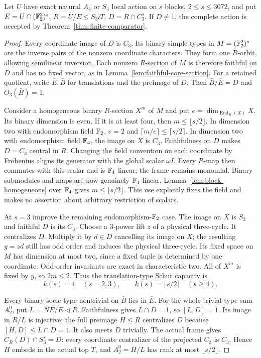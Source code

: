 \begin{theorem}
\label{thm:four-nonzero-core}
Let $U$ have exact natural $A_4$ or $S_4$ local action on $s$ blocks,
$2\leq s\leq3072$, and put $E=U\cap(\mathbb F_2^2)^s$,
$R=U/E\leq S_3\wr T$, $D=R\cap C_3^s$. If $D\ne1$, the
complete action is accepted by Theorem~\ref{thm:finite-comparator}.
\end{theorem}
\begin{proof}
Every coordinate image of $D$ is $C_3$. Its binary simple types in
$M=(\mathbb F_2^2)^s$ are the inverse pairs of the nonzero coordinate
characters. They form one $R$-orbit, allowing semilinear inversion.
Each nonzero $R$-section of $M$ is therefore faithful on $D$ and
has no fixed vector, as in Lemma~\ref{lem:faithful-core-section}.
For a retained quotient, write $\bar E,\bar B$ for translations
and the preimage of $D$. Then $\bar B/\bar E=D$ and
$O_3(\bar B)=1$.

Consider a homogeneous binary $R$-section $X^m$ of $M$ and put
$e=\dim_{\operatorname{End}_R(X)}X$. Its binary dimension is
even. If it is at least four, then $m\leq\lfloor s/2\rfloor$.
In dimension two with endomorphism field $\mathbb F_2$, $e=2$ and
$\lceil m/e\rceil\leq\lceil s/2\rceil$.
In dimension two with endomorphism field $\mathbb F_4$, the image on
$X$ is $C_3$. Faithfulness on $D$ makes $D=C_3$ central in $R$.
Changing the field convention on each coordinate by Frobenius aligns
its generator with the global scalar $\omega I$. Every $R$-map
then commutes with this scalar and is $\mathbb F_4$-linear; the frame
remains monomial. Binary submodules and maps are now genuinely
$\mathbb F_4$-linear. Lemma~\ref{lem:block-homogeneous} over $\mathbb F_4$
gives $m\leq\lfloor s/2\rfloor$. This use explicitly fixes the
field and makes no assertion about arbitrary restriction of scalars.

At $s=3$ improve the remaining endomorphism-$\mathbb F_2$ case. The
image on $X$ is $S_3$ and faithful $D$ is its $C_3$. Choose a
$3$-power lift $z$ of a physical three-cycle. It centralizes $D$.
Multiply it by $d\in D$ cancelling its image on $X$; the resulting
$y=zd$ still has odd order and induces the physical three-cycle.
Its fixed space on $M$ has dimension at most two, since a fixed
tuple is determined by one coordinate. Odd-order invariants are
exact in characteristic two. All of $X^m$ is fixed by $y$, so
$2m\leq2$. Thus the translation-type Schur capacity is
\[
 k(s)=1\quad(s=2,3),\qquad k(s)=\lceil s/2\rceil\quad(s\geq4).
\]

Every binary socle type nontrivial on $\bar B$ lies in $\bar E$.
For the whole trivial-type sum $A_2^0$, put $L=NE/E\lhd R$.
Faithfulness gives $L\cap D=1$, so $[L,D]=1$. Its image in
$R/L$ is injective; the full preimage $H\leq R$ centralizes $D$
because $[H,D]\leq L\cap D=1$. It also meets $D$ trivially.
The actual frame gives
$C_R(D)\cap S_3^s=D$: every coordinate centralizer of the
projected $C_3$ is $C_3$. Hence $H$ embeds in the actual top $T$,
and $A_2^0=H/L$ has rank at most $\lfloor s/2\rfloor$.


\end{proof}
